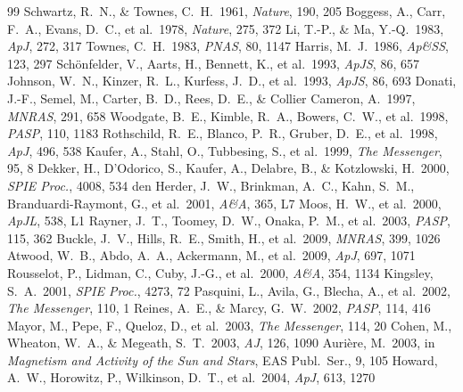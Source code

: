 \documentclass[twocolumn,10pt]{article}
\begin{document}
\begin{thebibliography}{99}
\footnotesize
\setlength{\itemsep}{0.1pt}
\setlength{\parskip}{0pt}
 Schwartz, R.~N., \& Townes, C.~H.\ 1961, \textit{Nature}, 190, 205
 Boggess, A., Carr, F.~A., Evans, D.~C., et al.\ 1978, \textit{Nature}, 275, 372
 Li, T.-P., \& Ma, Y.-Q.\ 1983, \textit{ApJ}, 272, 317
 Townes, C.~H.\ 1983, \textit{PNAS}, 80, 1147
 Harris, M.~J.\ 1986, \textit{Ap\&SS}, 123, 297
 Sch\"{o}nfelder, V., Aarts, H., Bennett, K., et al.\ 1993, \textit{ApJS}, 86, 657
 Johnson, W.~N., Kinzer, R.~L., Kurfess, J.~D., et al.\ 1993, \textit{ApJS}, 86, 693
 Donati, J.-F., Semel, M., Carter, B.~D., Rees, D.~E., \& Collier Cameron, A.\ 1997, \textit{MNRAS}, 291, 658
 Woodgate, B.~E., Kimble, R.~A., Bowers, C.~W., et al.\ 1998, \textit{PASP}, 110, 1183
 Rothschild, R.~E., Blanco, P.~R., Gruber, D.~E., et al.\ 1998, \textit{ApJ}, 496, 538
 Kaufer, A., Stahl, O., Tubbesing, S., et al.\ 1999, \textit{The Messenger}, 95, 8
 Dekker, H., D'Odorico, S., Kaufer, A., Delabre, B., \& Kotzlowski, H.\ 2000, \textit{SPIE Proc.}, 4008, 534
 den Herder, J.~W., Brinkman, A.~C., Kahn, S.~M., Branduardi-Raymont, G., et al.\ 2001, \textit{A\&A}, 365, L7
 Moos, H.~W., et al.\ 2000, \textit{ApJL}, 538, L1
 Rayner, J.~T., Toomey, D.~W., Onaka, P.~M., et al.\ 2003, \textit{PASP}, 115, 362
 Buckle, J.~V., Hills, R.~E., Smith, H., et al.\ 2009, \textit{MNRAS}, 399, 1026
 Atwood, W.~B., Abdo, A.~A., Ackermann, M., et al.\ 2009, \textit{ApJ}, 697, 1071
 Rousselot, P., Lidman, C., Cuby, J.-G., et al.\ 2000, \textit{A\&A}, 354, 1134
 Kingsley, S.~A.\ 2001, \textit{SPIE Proc.}, 4273, 72
 Pasquini, L., Avila, G., Blecha, A., et al.\ 2002, \textit{The Messenger}, 110, 1
 Reines, A.~E., \& Marcy, G.~W.\ 2002, \textit{PASP}, 114, 416
 Mayor, M., Pepe, F., Queloz, D., et al.\ 2003, \textit{The Messenger}, 114, 20
 Cohen, M., Wheaton, W.~A., \& Megeath, S.~T.\ 2003, \textit{AJ}, 126, 1090
 Auri\`{e}re, M.\ 2003, in \textit{Magnetism and Activity of the Sun and Stars}, EAS Publ.\ Ser., 9, 105
 Howard, A.~W., Horowitz, P., Wilkinson, D.~T., et al.\ 2004, \textit{ApJ}, 613, 1270

\end{thebibliography}
\end{document}
